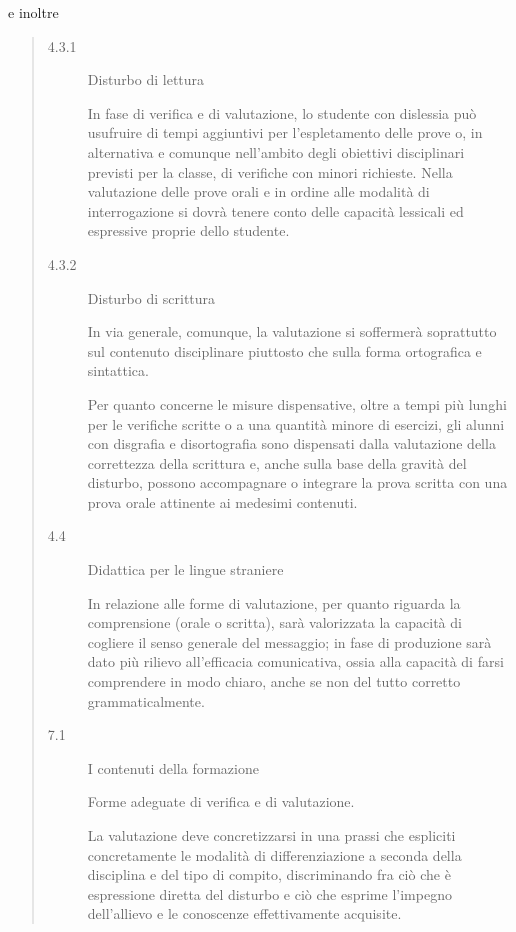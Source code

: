 e inoltre
\begin{quote}
\begin{description}
	\item[4.3.1] Disturbo di lettura
	
	In fase di verifica e di valutazione, lo studente con dislessia può usufruire di tempi aggiuntivi
	per l'espletamento delle prove o, in alternativa e comunque nell'ambito degli obiettivi disciplinari
	previsti per la classe, di verifiche con minori richieste.
	Nella valutazione delle prove orali e in ordine alle modalità di interrogazione si dovrà tenere
	conto delle capacità lessicali ed espressive proprie dello studente.
	\item[4.3.2] Disturbo di scrittura
	
	In via generale, comunque, la valutazione si soffermerà soprattutto sul contenuto disciplinare piuttosto che sulla forma ortografica e sintattica.
	
	\mancatesto Per quanto concerne le misure dispensative, oltre a tempi più lunghi per le verifiche scritte o a
	una quantità minore di esercizi, gli alunni con disgrafia e disortografia sono dispensati dalla
	valutazione della correttezza della scrittura e, anche sulla base della gravità del disturbo, possono
	accompagnare o integrare la prova scritta con una prova orale attinente ai medesimi contenuti.
	
	\item[4.4] Didattica per le lingue straniere
	
	In relazione alle forme di valutazione, per quanto riguarda la comprensione (orale o scritta), sarà valorizzata la capacità di cogliere il senso generale del messaggio; in fase di produzione sarà dato più rilievo all'efficacia comunicativa, ossia alla capacità di farsi comprendere in modo chiaro,
	anche se non del tutto corretto grammaticalmente.
	\item[7.1] I contenuti della formazione
	
	 Forme adeguate di verifica e di valutazione.
		
	La valutazione deve concretizzarsi in una prassi che espliciti concretamente le modalità di
			differenziazione a seconda della disciplina e del tipo di compito, discriminando fra ciò che è
			espressione diretta del disturbo e ciò che esprime l'impegno dell'allievo e le conoscenze
			effettivamente acquisite.

\end{description}
\end{quote}
